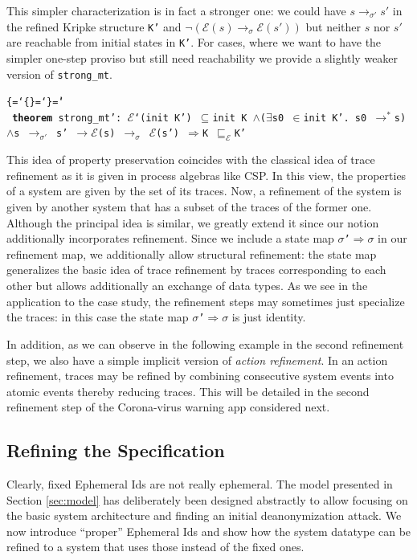 \documentclass{llncs}
\newenvironment{ttbox}{\begin{alltt}\ttbraces\small\tt}%
                      {\end{alltt}}
\def\ttbraces{\let\.=\nobreak\chardef\{=`\{\chardef\}=`\}\chardef\|=`\\}
\newcommand\ttand{\mbox{{$\land$}}}
\newcommand\ttfun{\mbox{{$\Rightarrow$}}}
\newcommand\ttimp{\mbox{{$\longrightarrow$}}}
\newcommand\ttexists{\mbox{{$\exists$}}}
\newcommand\ttin{\mbox{{$\in$}}}
\newcommand\ttImp{\mbox{{$\Longrightarrow$}}}
\newcommand\ttrelIstar{\mbox{{$\to^*$}}}
\newcommand\ttrel[1]{\mbox{{$\to_{#1}$}}}
\newcommand\ttsubseteq{\mbox{{$\subseteq$}}}
\newcommand\ttsigma{\mbox{{$\sigma$}}}
\newcommand\ttmref[1]{\mbox{{$\sqsubseteq_{#1}$}}}
\newcommand\ttmeref{\ttmref{\mathcal{E}}}
\newcommand\ttecal{\mbox{$\mathcal{E}$}}
\newcommand\ttimg{\mbox{\texttt{`}}}
\begin{document}
This simpler characterization is in fact a stronger one: we could have $s \ttrel{\sigma'} s'$ 
in the refined Kripke structure \texttt{K'} and $\neg(\ttecal(s) \ttrel{\sigma} \ttecal(s'))$
but neither $s$ nor $s'$ are reachable from initial states in \texttt{K'}.
For cases, where we want to have the simpler one-step proviso but still need 
reachability we provide a slightly weaker version of \texttt{strong\_mt}.
\begin{ttbox}
{\bf{theorem}} strong_mt':  
\ttecal\ttimg(init K') \ttsubseteq init K \ttand (\ttexists s0 \ttin init K'. s0  \ttrelIstar s)
 \ttand s \ttrel{\sigma'} s' \ttimp \ttecal(s) \ttrel{\sigma} \ttecal(s') \ttImp K \ttmeref K'
\end{ttbox}

This idea of property preservation coincides with the classical idea of
trace refinement as it is given in process algebras like CSP. In this view,
the properties of a system are given by the set of its traces. Now, a refinement
of the system is given by another system that has a subset of the traces of the 
former one.
Although the principal idea is similar, we greatly extend it since our notion
additionally incorporates refinement. Since we include a state map 
\texttt{\ttsigma'\ttfun \ttsigma} in our refinement map, we additionally
allow structural refinement: the state map generalizes the basic idea of
trace refinement by traces corresponding to each other but allows additionally
an exchange of data types. 
As we see in the application to the case study, the refinement steps may
sometimes just specialize the traces: in this case the state map 
\texttt{\ttsigma'\ttfun \ttsigma} is just identity. 

In addition, as we can observe in the following example in the second refinement
step, we also have a simple implicit version of {\it action refinement}. In an
action refinement, traces may be refined by combining consecutive system events
into atomic events thereby reducing traces. This will be detailed in the second refinement step
of the Corona-virus warning app considered next.

\subsection{Refining the Specification}
\label{sec:corref}
Clearly, fixed Ephemeral Ids are not really ephemeral. The model presented
in Section \ref{sec:model} has deliberately been designed abstractly to allow focusing on
the basic system architecture and finding an initial deanonymization attack.
We now introduce ``proper'' Ephemeral Ids and show how the system datatype can be refined to a system
that uses those instead of the fixed ones.
\end{document}

